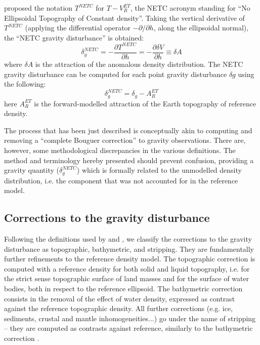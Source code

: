 \Textcite{Vajda2006} proposed the notation $T^{NETC}$ for $T - V_{R}^{ET}$, the {NETC} acronym standing for ``No Ellipsoidal Topography of Constant density''.
Taking the vertical derivative of $T^{NETC}$ (applying the differential operator $-\partial / \partial h$, along the ellipsoidal normal), the ``NETC gravity disturbance'' is obtained:
\begin{equation}
    \label{eq:red:DistgNETC1}
    \delta_{g}^{NETC} =
    -\frac{\partial T^{NETC}}{\partial h} =
    -\frac{\partial \delta V}{\partial h} \equiv \delta A
\end{equation}
where $\delta A$ is the attraction of the anomalous density distribution.
The NETC gravity disturbance can be computed for each point gravity disturbance $\delta g$ using the following:
\begin{equation}
    \label{eq:red:DistgNETC2}
    \delta_{g}^{NETC} = \delta_{g} - A_{R}^{ET}
\end{equation}
here $A_{R}^{ET}$ is the forward-modelled attraction of the Earth topography of reference density.

The process that has been just described is conceptually akin to computing and removing a ``complete Bouguer correction'' \parencites{Hinze2003}{Mikuska2006} to gravity observations.
There are, however, some methodological discrepancies in the various definitions.
The method and terminology hereby presented should prevent confusion, providing a gravity quantity ($\delta_{g}^{NETC}$) which is formally related to the unmodelled density distribution, i.e. the component that was not accounted for in the reference model.

\subsection{Corrections to the gravity disturbance}
\label{ss:SigIs:Defs:Corrs}
Following the definitions used by \textcite{Vajda2008} and \textcite{Tenzer2009}, we classify the corrections to the gravity disturbance as topographic, bathymetric, and stripping.
They are fundamentally further refinements to the reference density model.
The topographic correction is computed with a reference density for both solid and liquid topography, i.e. for the strict sense topographic surface of land masses and for the surface of water bodies, both in respect to the reference ellipsoid.
The bathymetric correction consists in the removal of the effect of water density, expressed as contrast against the reference topographic density.
All further corrections (e.g. ice, sediments, crustal and mantle inhomogeneities...) go under the name of stripping -- they are computed as contrasts against reference, similarly to the bathymetric correction \parencite{Hammer1963}.

